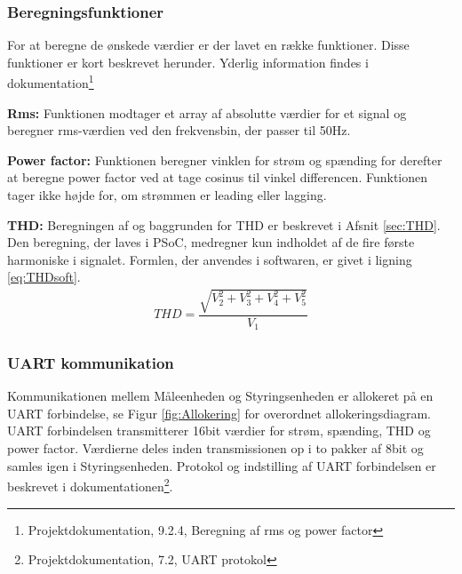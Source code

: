 
\subsubsection{Beregningsfunktioner}
For at beregne de ønskede værdier er der lavet en række funktioner. Disse funktioner er kort beskrevet herunder. Yderlig information findes i dokumentation\footnote{Projektdokumentation, 9.2.4, Beregning af rms og power factor}

\textbf{Rms:}
Funktionen modtager et array af absolutte værdier for et signal og beregner rms-værdien ved den frekvensbin, der passer til 50Hz.

\textbf{Power factor:}
Funktionen beregner vinklen for strøm og spænding for derefter at beregne power factor ved at tage cosinus til vinkel differencen. Funktionen tager ikke højde for, om strømmen er leading eller lagging.

\textbf{THD:}
Beregningen af og baggrunden for THD er beskrevet i Afsnit \ref{sec:THD}. Den beregning, der laves i PSoC, medregner kun indholdet af de fire første harmoniske i signalet. Formlen, der anvendes i softwaren, er givet i ligning \ref{eq:THDsoft}.
\begin{align}
\label{eq:THDsoft}
THD = \dfrac{\sqrt{V_2^{2}+V_3^{2}+V_4^{2}+V_5^{2}}}{V_{1}}
\end{align}
 

\subsubsection{UART kommunikation}
Kommunikationen mellem Måleenheden og Styringsenheden er allokeret på en UART forbindelse, se Figur \ref{fig:Allokering} for overordnet allokeringsdiagram. UART forbindelsen transmitterer 16bit værdier for strøm, spænding, THD og power factor. Værdierne deles inden transmissionen op i to pakker af 8bit og samles igen i Styringsenheden. Protokol og indstilling af UART forbindelsen er beskrevet i dokumentationen\footnote{Projektdokumentation, 7.2, UART protokol}.




